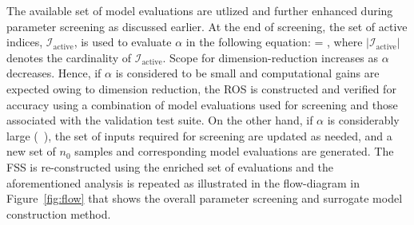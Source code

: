 The available set of model evaluations are utlized and further enhanced during
parameter screening as discussed earlier.  At the end of screening, the set of
active indices, $\mathcal{I}_\text{active}$, is used to evaluate $\alpha$ in the
following equation: 
\be
\alpha = ,
\label{eq:alpha}
\ee
{} where
$|\mathcal{I}_\text{active}|$ denotes the cardinality of
$\mathcal{I}_\text{active}$.  Scope for dimension-reduction increases as
$\alpha$ decreases.  Hence, if $\alpha$ is considered to be small and
computational gains are expected owing to dimension reduction, the ROS is
constructed and verified for accuracy using a combination of model evaluations
used for screening and those associated with the validation test suite.  On the
other hand, if $\alpha$ is considerably large (~), the set of inputs required for screening are updated as needed, and a
new set of $n_0$ samples and corresponding model evaluations are generated. The
FSS is re-constructed using the enriched set of evaluations and the
aforementioned analysis is repeated as illustrated in the flow-diagram
in Figure~\ref{fig:flow} that shows the overall 
parameter screening and surrogate model construction method.




